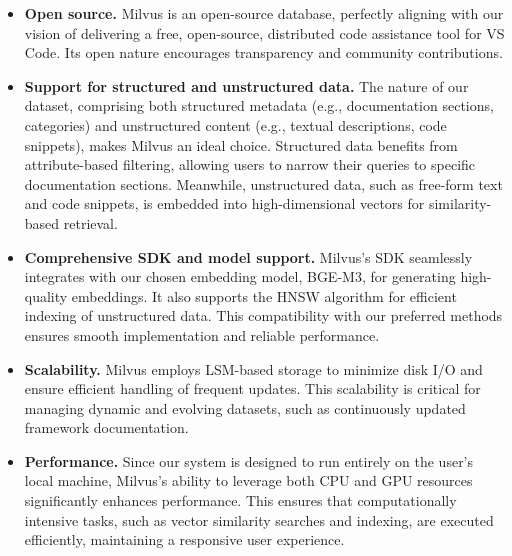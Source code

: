\begin{itemize}
	\item \textbf{Open source.} 
	Milvus is an open-source database, perfectly aligning with our vision of delivering a free, open-source, distributed code assistance tool for VS Code. Its open nature encourages transparency and community contributions.
	
	\item \textbf{Support for structured and unstructured data.} 
	The nature of our dataset, comprising both structured metadata (e.g., documentation sections, categories) and unstructured content (e.g., textual descriptions, code snippets), makes Milvus an ideal choice. Structured data benefits from attribute-based filtering, allowing users to narrow their queries to specific documentation sections. Meanwhile, unstructured data, such as free-form text and code snippets, is embedded into high-dimensional vectors for similarity-based retrieval.
	
	\item \textbf{Comprehensive SDK and model support.} 
	Milvus's SDK seamlessly integrates with our chosen embedding model, BGE-M3, for generating high-quality embeddings. It also supports the HNSW algorithm for efficient indexing of unstructured data. This compatibility with our preferred methods ensures smooth implementation and reliable performance.
	
	\item \textbf{Scalability.} 
	Milvus employs LSM-based storage to minimize disk I/O and ensure efficient handling of frequent updates. This scalability is critical for managing dynamic and evolving datasets, such as continuously updated framework documentation.
	
	\item \textbf{Performance.} 
	Since our system is designed to run entirely on the user's local machine, Milvus's ability to leverage both CPU and GPU resources significantly enhances performance. This ensures that computationally intensive tasks, such as vector similarity searches and indexing, are executed efficiently, maintaining a responsive user experience.
\end{itemize}

